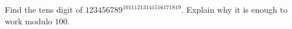 Find the tens digit of $123456789^{10111213141516171819}$. Explain why it is enough to work modulo $100$.
